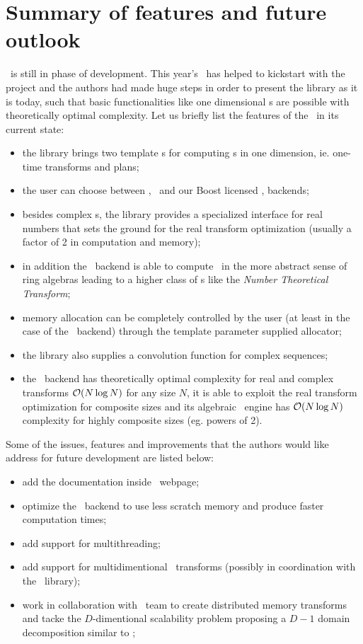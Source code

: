 \section{Summary of features and future outlook}
\boostfft\ is still in phase of development. This year's \gsoc\ has helped to
kickstart with the project and the authors had made huge steps in order to
present the library as it is today, such that basic functionalities like one
dimensional \dft s are possible with theoretically optimal complexity. 
Let us briefly list the features of the \boostfft\ in its current state:
\begin{itemize}
    \item the library brings two template \api s for computing \dft s in one
    dimension, ie. one-time transforms and plans;
    \item the user can choose between \gsl, \fftw\ and our Boost licensed \bsl,
    backends;
    \item besides complex \dft s, the library provides a specialized interface
    for real numbers that sets the ground for the real transform optimization
    (usually a factor of 2 in computation and memory);
    \item in addition the \bsl\ backend is able to compute \dft\ in the more
    abstract sense of ring algebras leading to a higher class of \dft s like the
    \emph{Number Theoretical Transform};
    \item memory allocation can be completely controlled by the user (at least
    in the case of the \bsl\ backend) through the template parameter supplied
    allocator;
    \item the library also supplies a convolution function for complex
    sequences;
    \item the \bsl\ backend has theoretically optimal complexity for real and
    complex transforms $\mathcal{O}(N \log N)$ for any size $N$, it is able to
    exploit the real transform optimization for composite sizes and its
    algebraic \dft\ engine has
    $\mathcal{O}(N \log N)$ complexity for highly composite sizes (eg. powers of 2).
\end{itemize}
Some of the issues, features and improvements that the authors would like address
for future development are listed below:
\begin{itemize}
    \item add the documentation inside \boostmath\ webpage;
    \item optimize the \bsl\ backend to use less scratch memory and produce
    faster computation times;
    \item add support for multithreading;
    \item add support for multidimentional \dft\ transforms (possibly in
    coordination with the \boostublas\ library);
    \item work in collaboration with \boostmpi\ team to create distributed memory
    transforms and tacke the $D$-dimentional scalability problem proposing a
    $D-1$ domain decomposition similar to \cite{pippig_13};
\end{itemize}
